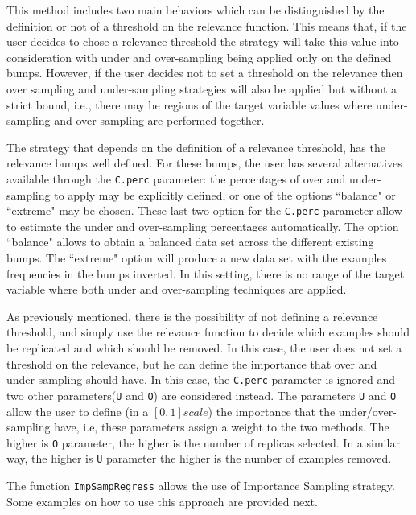 \documentclass[10pt,a4paper]{article}\usepackage[]{graphicx}\usepackage[]{color}
\begin{document}
This method includes two main behaviors which can be distinguished by the definition or not of a threshold on the relevance function. This means that, if the user decides to chose a relevance threshold the strategy will take this value into consideration with under and over-sampling being applied only on the defined bumps. However, if the user decides not to set a threshold on the relevance then over sampling and under-sampling strategies will also be applied but without a strict bound, i.e., there may be regions of the target variable values where under-sampling and over-sampling are performed together.

The strategy that depends on the definition of a relevance threshold, has the relevance bumps well defined. For these bumps, the user has several alternatives available through the \texttt{C.perc} parameter: the percentages of over and under-sampling to apply may be explicitly defined, or one of the options ``balance" or ``extreme" may be chosen. These last two option for the \texttt{C.perc} parameter allow to estimate the under and over-sampling percentages automatically. The option ``balance" allows to obtain  a balanced data set across the different existing bumps. The ``extreme" option will produce a new data set with the examples frequencies in the bumps inverted. In this setting, there is no range of the target variable where both under and over-sampling techniques are applied. 

As previously mentioned, there is the possibility of not defining a relevance threshold, and simply use the relevance function to decide which examples should be replicated and which should be removed. In this case, the user does not set a threshold on the relevance, but he can define the importance that over and under-sampling should have. In this case, the \texttt{C.perc} parameter is ignored and two other parameters(\texttt{U} and \texttt{O}) are considered instead. The parameters \texttt{U} and \texttt{O} allow the user to define (in a $[0,1] scale$) the importance that the under/over-sampling have, i.e, these parameters assign a weight to the two methods. The higher is \texttt{O} parameter, the higher is the number of replicas selected. In a similar way, the higher is \texttt{U} parameter the higher is the number of examples removed.

The function \texttt{ImpSampRegress} allows the use of Importance Sampling strategy. Some examples on how to use this approach are provided next.
\end{document}
